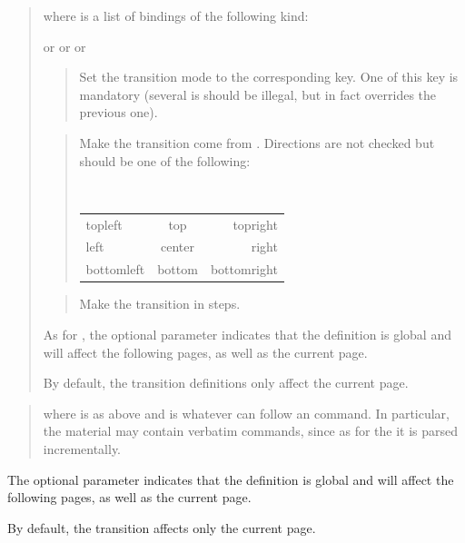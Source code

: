 \documentclass[12pt]{article}
\begin{document}
\docdef \advitransition \doctt {[global]}
\begin{quote}
where  is a list of bindings of the following kind:

 or  or  or 
\begin{quote}
Set the transition mode to the corresponding key.
One of this key is mandatory (several is should be illegal, but in fact
overrides the previous one). 
\end{quote}

\begin{quote}
Make the transition come from .  Directions are not checked
but should be one of the following: 
\begin{center}
\tt
\begin{tabular}{l@{\qquad}c@{\qquad}r}
topleft&   top& topright\\
left&  center&  right \\
bottomleft& bottom & bottomright\\
\end{tabular}
\end{center}
\end{quote}

\begin{quote}
Make the transition in  steps. 
\end{quote}
As for \docdef \advibg, the optional parameter  indicates that
the definition is global and will affect the following pages, 
as well as the current page. 

By default, the transition definitions only affect the current page. 
\end{quote}

\medskip\noindent
\docdef \advitransbox {}
\begin{quote}
where  is as above and  is
whatever can follow an \docdef \hbox{} command. In particular, the material
may contain verbatim commands, since as for the \docdef\hbox{} it is 
parsed incrementally.
\end{quote}

The optional parameter  indicates that
the definition is global and will affect the following pages, 
as well as the current page.

By default, the transition affects only the current page.
\end{document}
